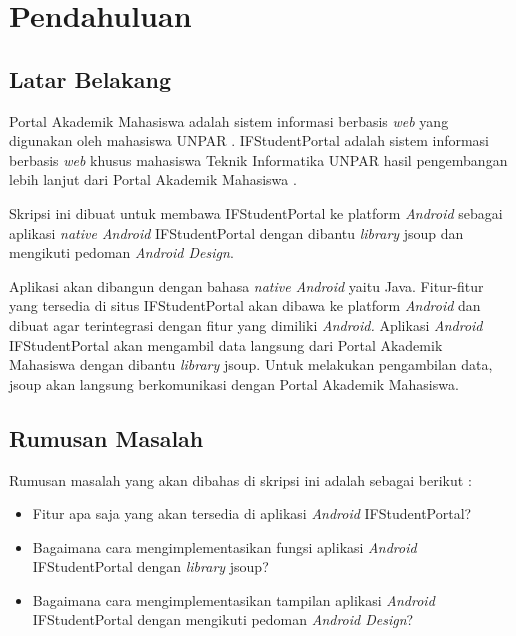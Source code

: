 \chapter{Pendahuluan}
\label{chap:intro}
   
\section{Latar Belakang}
\label{sec:label}

Portal Akademik Mahasiswa adalah sistem informasi berbasis \textit{web} yang digunakan oleh mahasiswa UNPAR \cite{studentportalunpar}. IFStudentPortal adalah sistem informasi berbasis \textit{web} khusus mahasiswa Teknik Informatika UNPAR hasil pengembangan  lebih lanjut dari Portal Akademik Mahasiswa \cite{herfan:15:portal}. 

Skripsi ini dibuat untuk membawa IFStudentPortal ke platform \textit{Android} sebagai aplikasi \textit{native Android} IFStudentPortal dengan dibantu \textit{library} jsoup dan mengikuti pedoman \textit{Android Design}. 

 Aplikasi akan dibangun dengan bahasa \textit{native Android} yaitu Java. Fitur-fitur yang tersedia di situs IFStudentPortal akan dibawa ke platform \textit{Android} dan dibuat agar terintegrasi dengan fitur yang dimiliki \textit{Android.} Aplikasi \textit{Android} IFStudentPortal akan mengambil data langsung dari Portal Akademik Mahasiswa dengan dibantu \textit{library} jsoup. Untuk melakukan pengambilan data, jsoup akan langsung berkomunikasi dengan Portal Akademik Mahasiswa.  

\section{Rumusan Masalah}
\label{sec:rumusan}
Rumusan masalah yang akan dibahas di skripsi ini adalah sebagai berikut :
\begin{itemize}
    \item Fitur apa saja yang akan tersedia di aplikasi \textit{Android} IFStudentPortal?
    \item Bagaimana cara mengimplementasikan fungsi aplikasi \textit{Android} IFStudentPortal dengan \textit{library} jsoup?
    \item Bagaimana cara mengimplementasikan tampilan aplikasi \textit{Android} IFStudentPortal dengan mengikuti pedoman \textit{Android Design}?
\end{itemize}

